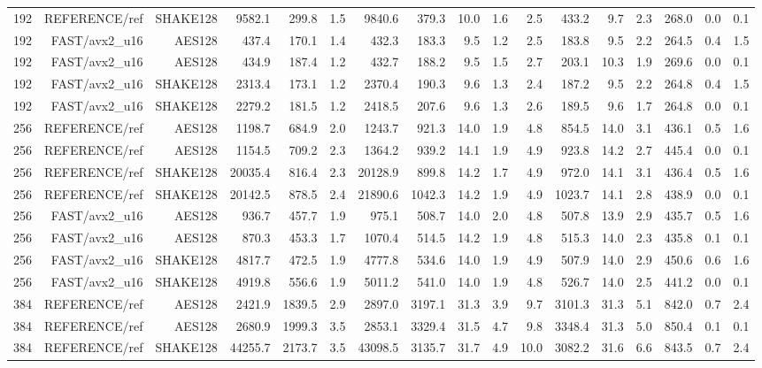 \begin{table}[t]
\begin{tabular}{rrrrrrrrrrrrrrrrr}
192 & REFERENCE/ref & SHAKE128 & 9582.1 & 299.8 & 1.5 & 9840.6 & 379.3 & 10.0 & 1.6 & 2.5 & 433.2 & 9.7 & 2.3 & 268.0 & 0.0 & 0.1 \\
192 & FAST/avx2_u16 & AES128 & 437.4 & 170.1 & 1.4 & 432.3 & 183.3 & 9.5 & 1.2 & 2.5 & 183.8 & 9.5 & 2.2 & 264.5 & 0.4 & 1.5 \\
192 & FAST/avx2_u16 & AES128 & 434.9 & 187.4 & 1.2 & 432.7 & 188.2 & 9.5 & 1.5 & 2.7 & 203.1 & 10.3 & 1.9 & 269.6 & 0.0 & 0.1 \\
192 & FAST/avx2_u16 & SHAKE128 & 2313.4 & 173.1 & 1.2 & 2370.4 & 190.3 & 9.6 & 1.3 & 2.4 & 187.2 & 9.5 & 2.2 & 264.8 & 0.4 & 1.5 \\
192 & FAST/avx2_u16 & SHAKE128 & 2279.2 & 181.5 & 1.2 & 2418.5 & 207.6 & 9.6 & 1.3 & 2.6 & 189.5 & 9.6 & 1.7 & 264.8 & 0.0 & 0.1 \\
256 & REFERENCE/ref & AES128 & 1198.7 & 684.9 & 2.0 & 1243.7 & 921.3 & 14.0 & 1.9 & 4.8 & 854.5 & 14.0 & 3.1 & 436.1 & 0.5 & 1.6 \\
256 & REFERENCE/ref & AES128 & 1154.5 & 709.2 & 2.3 & 1364.2 & 939.2 & 14.1 & 1.9 & 4.9 & 923.8 & 14.2 & 2.7 & 445.4 & 0.0 & 0.1 \\
256 & REFERENCE/ref & SHAKE128 & 20035.4 & 816.4 & 2.3 & 20128.9 & 899.8 & 14.2 & 1.7 & 4.9 & 972.0 & 14.1 & 3.1 & 436.4 & 0.5 & 1.6 \\
256 & REFERENCE/ref & SHAKE128 & 20142.5 & 878.5 & 2.4 & 21890.6 & 1042.3 & 14.2 & 1.9 & 4.9 & 1023.7 & 14.1 & 2.8 & 438.9 & 0.0 & 0.1 \\
256 & FAST/avx2_u16 & AES128 & 936.7 & 457.7 & 1.9 & 975.1 & 508.7 & 14.0 & 2.0 & 4.8 & 507.8 & 13.9 & 2.9 & 435.7 & 0.5 & 1.6 \\
256 & FAST/avx2_u16 & AES128 & 870.3 & 453.3 & 1.7 & 1070.4 & 514.5 & 14.2 & 1.9 & 4.8 & 515.3 & 14.0 & 2.3 & 435.8 & 0.1 & 0.1 \\
256 & FAST/avx2_u16 & SHAKE128 & 4817.7 & 472.5 & 1.9 & 4777.8 & 534.6 & 14.0 & 1.9 & 4.9 & 507.9 & 14.0 & 2.9 & 450.6 & 0.6 & 1.6 \\
256 & FAST/avx2_u16 & SHAKE128 & 4919.8 & 556.6 & 1.9 & 5011.2 & 541.0 & 14.0 & 1.9 & 4.8 & 526.7 & 14.0 & 2.5 & 441.2 & 0.0 & 0.1 \\
384 & REFERENCE/ref & AES128 & 2421.9 & 1839.5 & 2.9 & 2897.0 & 3197.1 & 31.3 & 3.9 & 9.7 & 3101.3 & 31.3 & 5.1 & 842.0 & 0.7 & 2.4 \\
384 & REFERENCE/ref & AES128 & 2680.9 & 1999.3 & 3.5 & 2853.1 & 3329.4 & 31.5 & 4.7 & 9.8 & 3348.4 & 31.3 & 5.0 & 850.4 & 0.1 & 0.1 \\
384 & REFERENCE/ref & SHAKE128 & 44255.7 & 2173.7 & 3.5 & 43098.5 & 3135.7 & 31.7 & 4.9 & 10.0 & 3082.2 & 31.6 & 6.6 & 843.5 & 0.7 & 2.4 \\

\end{tabular}
\end{table}

